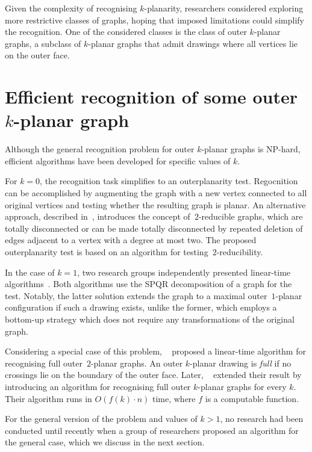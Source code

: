Given the complexity of recognising \(k\)-planarity, researchers considered exploring more restrictive classes of graphs, hoping that imposed limitations could simplify the recognition. One of the considered classes is the class of outer \(k\)-planar graphs, a subclass of \(k\)-planar graphs that admit drawings where all vertices lie on the outer face.


\section{Efficient recognition of some outer \(k\)-planar graph}

Although the general recognition problem for outer \(k\)-planar graphs is NP-hard, efficient algorithms have been developed for specific values of \(k\).

For \(k = 0\), the recognition task simplifies to an outerplanarity test. Regocnition can be accomplished by augmenting the graph with a new vertex connected to all original vertices and testing whether the resulting graph is planar. An alternative approach, described in~\cite{linear-op}, introduces the concept of~\(2\)-reducible graphs, which are totally disconnected or can be made totally disconnected by repeated deletion of edges adjacent to a vertex with a degree at most two. The proposed outerplanarity test is based on an algorithm for testing~\(2\)-reducibility.

In the case of \(k = 1\), two research groups independently presented linear-time algorithms~\cite{linear-o1p_, linear-o1p}. Both algorithms use the SPQR decomposition of a graph for the test. Notably, the latter solution extends the graph to a maximal outer~\(1\)-planar configuration if such a drawing exists, unlike the former, which employs a bottom-up strategy which does not require any transformations of the original graph.

Considering a special case of this problem, \citeauthor{linear-full-o2p}~\cite{linear-full-o2p} proposed a linear-time algorithm for recognising full outer~\(2\)-planar graphs. An outer \(k\)-planar drawing is \emph{full} if no crossings lie on the boundary of the outer face. Later, \citeauthor{linear-full-okp}~\cite{linear-full-okp} extended their result by introducing an algorithm for recognising full outer \(k\)-planar graphs for every \(k\). Their algorithm runs in \(O(f(k) \cdot n)\) time, where \(f\) is a computable function.

For the general version of the problem and values of \(k > 1\), no research had been conducted until recently when a group of researchers proposed an algorithm for the general case, which we discuss in the next section.


